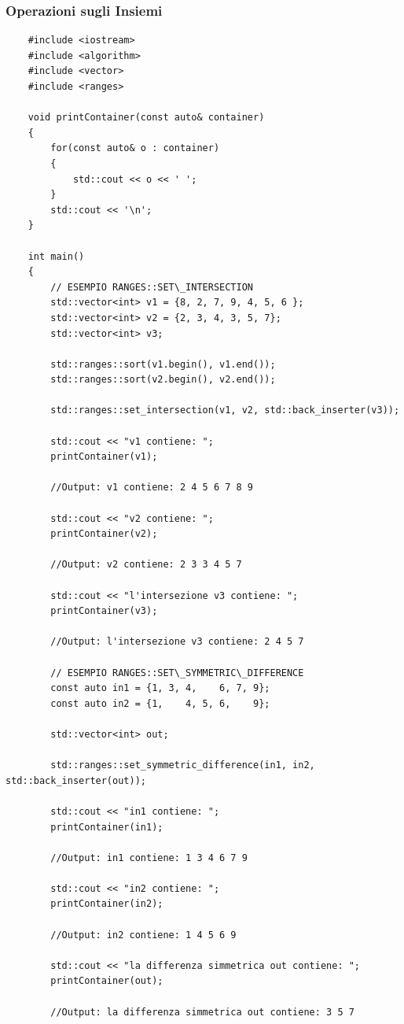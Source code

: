 \subsubsection{Operazioni sugli Insiemi}

\label{ranges_set}

\begin{lstlisting}
	#include <iostream>
	#include <algorithm>
	#include <vector>
	#include <ranges>
	
	void printContainer(const auto& container)
	{
		for(const auto& o : container)
		{
			std::cout << o << ' ';
		}
		std::cout << '\n';
	}
	
	int main()
	{
		// ESEMPIO RANGES::SET\_INTERSECTION
		std::vector<int> v1 = {8, 2, 7, 9, 4, 5, 6 };
		std::vector<int> v2 = {2, 3, 4, 3, 5, 7};
		std::vector<int> v3;
		
		std::ranges::sort(v1.begin(), v1.end());
		std::ranges::sort(v2.begin(), v2.end());
		
		std::ranges::set_intersection(v1, v2, std::back_inserter(v3));
		
		std::cout << "v1 contiene: ";
		printContainer(v1); 
		
		//Output: v1 contiene: 2 4 5 6 7 8 9 
		
		std::cout << "v2 contiene: ";
		printContainer(v2); 
		
		//Output: v2 contiene: 2 3 3 4 5 7 
		
		std::cout << "l'intersezione v3 contiene: ";
		printContainer(v3);
		
		//Output: l'intersezione v3 contiene: 2 4 5 7
		
		// ESEMPIO RANGES::SET\_SYMMETRIC\_DIFFERENCE
		const auto in1 = {1, 3, 4,    6, 7, 9};
		const auto in2 = {1,    4, 5, 6,    9};
		
		std::vector<int> out;
		
		std::ranges::set_symmetric_difference(in1, in2, std::back_inserter(out));
		
		std::cout << "in1 contiene: ";
		printContainer(in1);
		
		//Output: in1 contiene: 1 3 4 6 7 9
		
		std::cout << "in2 contiene: ";
		printContainer(in2);
		
		//Output: in2 contiene: 1 4 5 6 9
		
		std::cout << "la differenza simmetrica out contiene: ";
		printContainer(out);
		
		//Output: la differenza simmetrica out contiene: 3 5 7 
		

\end{lstlisting}
